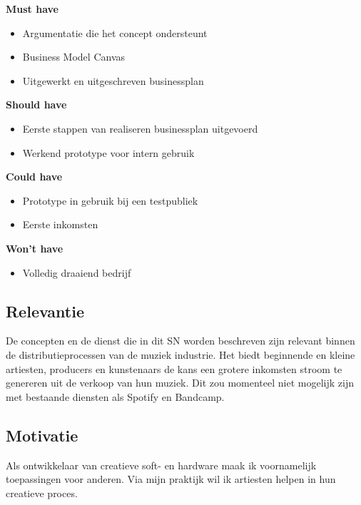 \parbox{\textwidth}{
    \textbf{Must have}
    \begin{itemize}
        \item Argumentatie die het concept ondersteunt
        \item Business Model Canvas
        \item Uitgewerkt en uitgeschreven businessplan
    \end{itemize}
    \textbf{Should have}
    \begin{itemize}
        \item Eerste stappen van realiseren businessplan uitgevoerd
        \item Werkend prototype voor intern gebruik
    \end{itemize}
    \textbf{Could have}
    \begin{itemize}
        \item Prototype in gebruik bij een testpubliek
        \item Eerste inkomsten
    \end{itemize}
    \textbf{Won't have}
    \begin{itemize}
        \item Volledig draaiend bedrijf
    \end{itemize}
}

\subsection{Relevantie}
De concepten en de dienst die in dit SN worden beschreven zijn relevant binnen de distributieprocessen van de muziek industrie. Het biedt beginnende en kleine artiesten, producers en kunstenaars de kans een grotere inkomsten stroom te genereren uit de verkoop van hun muziek. Dit zou momenteel niet mogelijk zijn met bestaande diensten als Spotify en Bandcamp.

\subsection{Motivatie}
Als ontwikkelaar van creatieve soft- en hardware maak ik voornamelijk toepassingen voor anderen. Via mijn praktijk wil ik artiesten helpen in hun creatieve proces.

